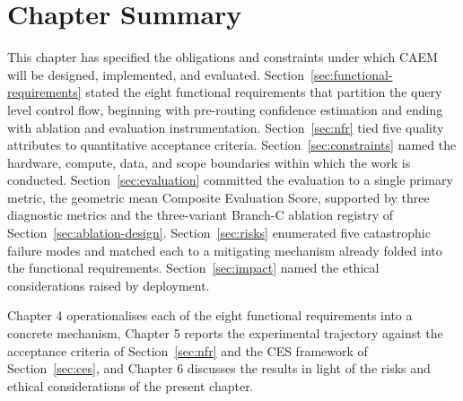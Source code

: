 \section{Chapter Summary}
\label{sec:ch3-summary}

This chapter has specified the obligations and constraints under which CAEM will be designed, implemented, and evaluated. Section~\ref{sec:functional-requirements} stated the eight functional requirements that partition the query level control flow, beginning with pre-routing confidence estimation and ending with ablation and evaluation instrumentation. Section~\ref{sec:nfr} tied five quality attributes to quantitative acceptance criteria. Section~\ref{sec:constraints} named the hardware, compute, data, and scope boundaries within which the work is conducted. Section~\ref{sec:evaluation} committed the evaluation to a single primary metric, the geometric mean Composite Evaluation Score, supported by three diagnostic metrics and the three-variant Branch-C ablation registry of Section~\ref{sec:ablation-design}. Section~\ref{sec:risks} enumerated five catastrophic failure modes and matched each to a mitigating mechanism already folded into the functional requirements. Section~\ref{sec:impact} named the ethical considerations raised by deployment.

Chapter 4 operationalises each of the eight functional requirements into a concrete mechanism, Chapter 5 reports the experimental trajectory against the acceptance criteria of Section~\ref{sec:nfr} and the CES framework of Section~\ref{sec:ces}, and Chapter 6 discusses the results in light of the risks and ethical considerations of the present chapter.
